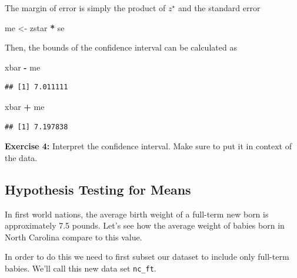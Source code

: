 \documentclass[
]{article}
\newenvironment{Shaded}{\begin{snugshade}}{\end{snugshade}}
\newcommand{\FunctionTok}[1]{\textcolor[rgb]{0.13,0.29,0.53}{\textbf{#1}}}
\newcommand{\NormalTok}[1]{#1}
\newcommand{\OtherTok}[1]{\textcolor[rgb]{0.56,0.35,0.01}{#1}}
\newcommand{\SpecialCharTok}[1]{\textcolor[rgb]{0.81,0.36,0.00}{\textbf{#1}}}
\newcommand{\StringTok}[1]{\textcolor[rgb]{0.31,0.60,0.02}{#1}}
\begin{document}
The margin of error is simply the product of \(z^\star\) and the
standard error

\begin{Shaded}
\begin{Highlighting}[]
\NormalTok{me }\OtherTok{\textless{}{-}}\NormalTok{ zstar }\SpecialCharTok{*}\NormalTok{ se}
\end{Highlighting}
\end{Shaded}

Then, the bounds of the confidence interval can be calculated as

\begin{Shaded}
\begin{Highlighting}[]
\NormalTok{xbar }\SpecialCharTok{{-}}\NormalTok{ me}
\end{Highlighting}
\end{Shaded}

\begin{verbatim}
## [1] 7.011111
\end{verbatim}

\begin{Shaded}
\begin{Highlighting}[]
\NormalTok{xbar }\SpecialCharTok{+}\NormalTok{ me}
\end{Highlighting}
\end{Shaded}

\begin{verbatim}
## [1] 7.197838
\end{verbatim}

\textbf{Exercise 4:} Interpret the confidence interval. Make sure to put
it in context of the data.

\subsection{Hypothesis Testing for
Means}\label{hypothesis-testing-for-means}

In first world nations, the average birth weight of a full-term new born
is approximately 7.5 pounds. Let's see how the average weight of babies
born in North Carolina compare to this value.

In order to do this we need to first subset our dataset to include only
full-term babies. We'll call this new data set \texttt{nc\_ft}.

\begin{Shaded}
\end{Shaded}
\end{document}
